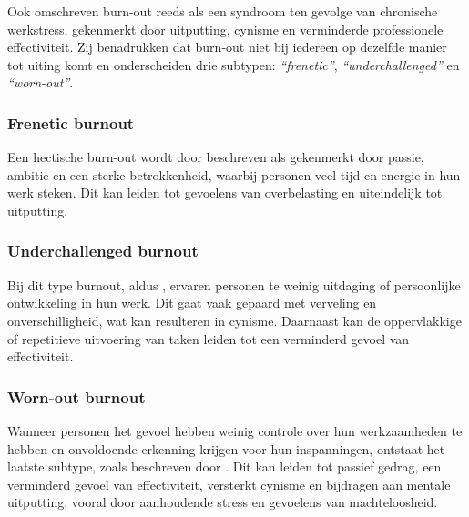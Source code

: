 \vspace{1em}

Ook \textcite{MonteroMarin2011} omschreven burn-out reeds als een syndroom ten gevolge van chronische werkstress, gekenmerkt door uitputting, cynisme en verminderde professionele effectiviteit. Zij benadrukken dat burn-out niet bij iedereen op dezelfde manier tot uiting komt en onderscheiden drie subtypen: \textit{“frenetic”}, \textit{“underchallenged”} en \textit{“worn-out”}.

\vspace{1em}

\subsubsection{Frenetic burnout}
\label{subsubsec:frenetic}

Een hectische burn-out wordt door \textcite{MonteroMarin2011} beschreven als gekenmerkt door passie, ambitie en een sterke betrokkenheid, waarbij personen veel tijd en energie in hun werk steken. Dit kan leiden tot gevoelens van overbelasting en uiteindelijk tot uitputting.

\vspace{1em}

\subsubsection{Underchallenged burnout}
\label{subsubsec:underchallenged}

Bij dit type burnout, aldus \textcite{MonteroMarin2011}, ervaren personen te weinig uitdaging of persoonlijke ontwikkeling in hun werk. Dit gaat vaak gepaard met verveling en onverschilligheid, wat kan resulteren in cynisme. Daarnaast kan de oppervlakkige of repetitieve uitvoering van taken leiden tot een verminderd gevoel van effectiviteit.

\vspace{1em}

\subsubsection{Worn-out burnout}
\label{subsubsec:worn-out}

Wanneer personen het gevoel hebben weinig controle over hun werkzaamheden te hebben en onvoldoende erkenning krijgen voor hun inspanningen, ontstaat het laatste subtype, zoals beschreven door \textcite{MonteroMarin2011}. Dit kan leiden tot passief gedrag, een verminderd gevoel van effectiviteit, versterkt cynisme en bijdragen aan mentale uitputting, vooral door aanhoudende stress en gevoelens van machteloosheid.

